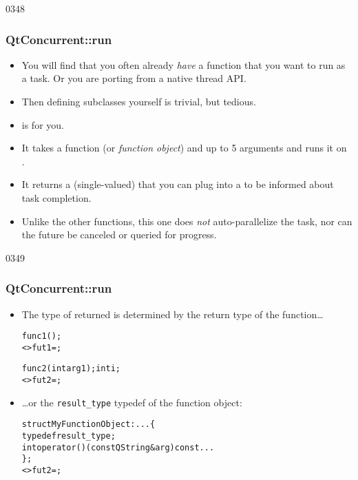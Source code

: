 \begin{slide}{0348}
\frametitle{QtConcurrent::run}
  \begin{itemize}
  \item You will find that you often already \emph{have} a function
    that you want to run as a task. Or you are porting from a native thread
    API.
  \item Then defining  subclasses yourself is trivial,
    but tedious.
  \item {} is for you.
  \item It takes a function (or \emph{function object}) and up to 5
    arguments and runs it on .
  \item It returns a (single-valued)  that you can plug
    into a  to be informed about task completion.
  \item \pleaseNote Unlike the other  functions,
    this one does \emph{not} auto-parallelize the task, nor can the
    future be canceled or queried for progress.
  \end{itemize}
\end{slide}
\begin{slide}[fragile]{0349}
\frametitle{QtConcurrent::run}
  \begin{itemize}
  \item The type of  returned is determined by the
    return type of the function\ldots
\begin{alltt}\footnotesize
   func1();
  <> fut1 = ;

   func2( int arg1 ); int i;
  <> fut2 = ;
\end{alltt}
  \item \ldots or the \texttt{result\_type} typedef of the function object:
\begin{alltt}\footnotesize
  struct MyFunctionObject : ... \{
    typedef  result_type;
    int operator()( const QString \& arg ) const { ... }
  \};
  <> fut2 = ;\end{alltt}
  \end{itemize}
\end{slide}

